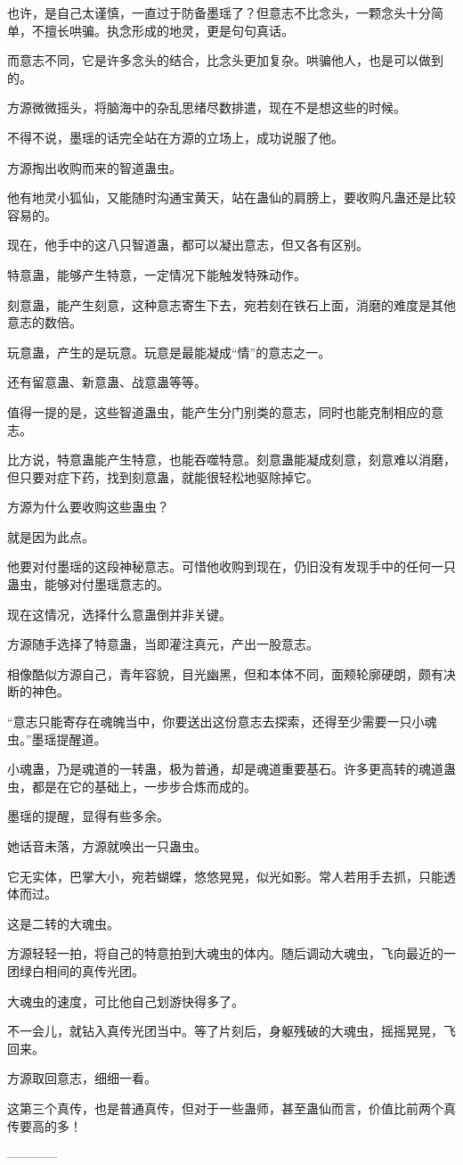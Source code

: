 \begin{this_body}
也许，是自己太谨慎，一直过于防备墨瑶了？但意志不比念头，一颗念头十分简单，不擅长哄骗。执念形成的地灵，更是句句真话。

而意志不同，它是许多念头的结合，比念头更加复杂。哄骗他人，也是可以做到的。

方源微微摇头，将脑海中的杂乱思绪尽数排遣，现在不是想这些的时候。

不得不说，墨瑶的话完全站在方源的立场上，成功说服了他。

方源掏出收购而来的智道蛊虫。

他有地灵小狐仙，又能随时沟通宝黄天，站在蛊仙的肩膀上，要收购凡蛊还是比较容易的。

现在，他手中的这八只智道蛊，都可以凝出意志，但又各有区别。

特意蛊，能够产生特意，一定情况下能触发特殊动作。

刻意蛊，能产生刻意，这种意志寄生下去，宛若刻在铁石上面，消磨的难度是其他意志的数倍。

玩意蛊，产生的是玩意。玩意是最能凝成“情”的意志之一。

还有留意蛊、新意蛊、战意蛊等等。

值得一提的是，这些智道蛊虫，能产生分门别类的意志，同时也能克制相应的意志。

比方说，特意蛊能产生特意，也能吞噬特意。刻意蛊能凝成刻意，刻意难以消磨，但只要对症下药，找到刻意蛊，就能很轻松地驱除掉它。

方源为什么要收购这些蛊虫？

就是因为此点。

他要对付墨瑶的这段神秘意志。可惜他收购到现在，仍旧没有发现手中的任何一只蛊虫，能够对付墨瑶意志的。

现在这情况，选择什么意蛊倒并非关键。

方源随手选择了特意蛊，当即灌注真元，产出一股意志。

相像酷似方源自己，青年容貌，目光幽黑，但和本体不同，面颊轮廓硬朗，颇有决断的神色。

“意志只能寄存在魂魄当中，你要送出这份意志去探索，还得至少需要一只小魂虫。”墨瑶提醒道。

小魂蛊，乃是魂道的一转蛊，极为普通，却是魂道重要基石。许多更高转的魂道蛊虫，都是在它的基础上，一步步合炼而成的。

墨瑶的提醒，显得有些多余。

她话音未落，方源就唤出一只蛊虫。

它无实体，巴掌大小，宛若蝴蝶，悠悠晃晃，似光如影。常人若用手去抓，只能透体而过。

这是二转的大魂虫。

方源轻轻一拍，将自己的特意拍到大魂虫的体内。随后调动大魂虫，飞向最近的一团绿白相间的真传光团。

大魂虫的速度，可比他自己划游快得多了。

不一会儿，就钻入真传光团当中。等了片刻后，身躯残破的大魂虫，摇摇晃晃，飞回来。

方源取回意志，细细一看。

这第三个真传，也是普通真传，但对于一些蛊师，甚至蛊仙而言，价值比前两个真传要高的多！

------------

\end{this_body}

